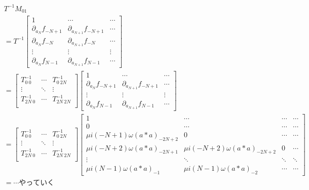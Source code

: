 \documentclass[11pt,a4paper,titlepage]{jsreport}
\theoremstyle{definition}
\begin{document}
\begin{equation}
  \begin{split}
    &T^{-1}M_{01} \\
    &= T^{-1}
    \begin{bmatrix}
      1 & \cdots & \cdots \\
      \partial_{a_N} f_{-N+1} & \partial_{a_{N+1}} f_{-N+1}  & \cdots \\
      \partial_{a_N} f_{-N} & \partial_{a_{N+1}} f_{-N}  & \cdots \\
      \vdots & \vdots & \vdots \\
      \partial_{a_N} f_{N-1} & \partial_{a_{N+1}} f_{N-1}  & \cdots
    \end{bmatrix}\\
    &= \begin{bmatrix}
      T^{-1}_{0\ 0} & \cdots & T^{-1}_{0\ 2N} \\
      \vdots & \ddots & \vdots \\
      T^{-1}_{2N\ 0} & \cdots & T^{-1}_{2N\ 2N} \\
    \end{bmatrix}
    \begin{bmatrix}
      1 & \cdots & \cdots \\
      \partial_{a_N} f_{-N+1} & \partial_{a_{N+1}} f_{-N+1}  & \cdots \\
      \vdots & \vdots & \vdots \\
      \partial_{a_N} f_{N-1} & \partial_{a_{N+1}} f_{N-1}  & \cdots
    \end{bmatrix}\\
    &= \begin{bmatrix}
      T^{-1}_{0\ 0} & \cdots & T^{-1}_{0\ 2N} \\
      \vdots & \ddots & \vdots \\
      T^{-1}_{2N\ 0} & \cdots & T^{-1}_{2N\ 2N} \\
    \end{bmatrix}
    \begin{bmatrix}
      1 & \cdots & \cdots  & \cdots\\
      0 & \cdots & \cdots  & \cdots\\
      \mu i (-N+1) \omega (a*a)_{-2N+2} & 0 & \cdots & \cdots\\
      \mu i (-N+2) \omega (a*a)_{-2N+1} & \mu i (-N+2) \omega (a*a)_{-2N+2} & 0 & \cdots \\
      \vdots & \ddots & \ddots & \ddots \\
      \mu i (N-1) \omega (a*a)_{-1} & \mu i (N-1) \omega (a*a)_{-2}  & \cdots & \cdots
    \end{bmatrix}\\
    &=\cdots やっていく
  \end{split}
\end{equation}
\end{document}
